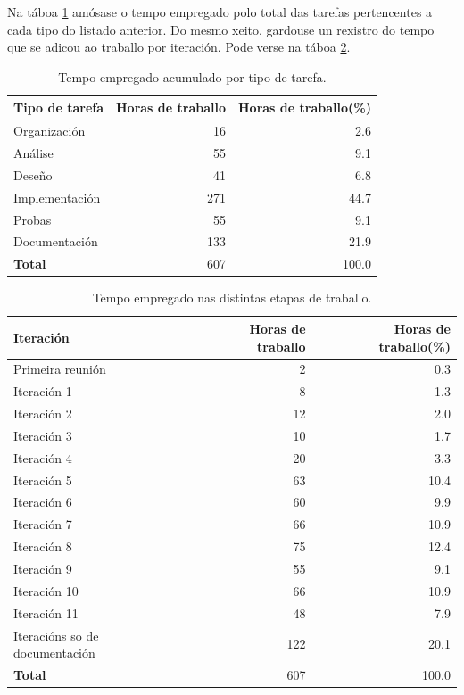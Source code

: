 Na táboa \ref{tab:tipo} amósase o tempo empregado polo total das tarefas pertencentes a cada tipo do listado anterior. Do mesmo xeito, gardouse un rexistro do tempo que se adicou ao traballo por iteración. Pode verse na táboa \ref{tab:custo}.

\begin{table}[H]
	\centering
	\begin{tabular}{|p{8cm}|r|r|}
		\hline
		\rowcolor{blue!10}
		Tipo de tarefa & Horas de traballo & Horas de traballo(\%) \\
		\hline
		Organización & 16 &  2.6\\
		\hline
		Análise & 55 &  9.1\\
		\hline
		Deseño & 41 &  6.8\\
		\hline
		Implementación & 271 &  44.7\\
		\hline
		Probas & 55 &  9.1\\
		\hline
		Documentación & 133 &  21.9\\
		\hline
		\textbf{Total} & 607 &  100.0\\
		\hline
	\end{tabular}
	\caption{Tempo empregado acumulado por tipo de tarefa.}
	\label{tab:tipo}
\end{table}


\begin{table}[H]
	\centering
	\begin{tabular}{|p{8cm}|r|r|}
		\hline
		\rowcolor{blue!10}
		Iteración & Horas de traballo & Horas de traballo(\%)\\
		\hline
		Primeira reunión & 2 &  0.3\\
		\hline
		Iteración 1 & 8 &  1.3\\
		\hline
		Iteración 2 & 12 &  2.0\\
		\hline
		Iteración 3 & 10 &  1.7\\
		\hline
		Iteración 4 & 20 &  3.3\\
		\hline
		Iteración 5 & 63 &  10.4\\
		\hline
		Iteración 6 & 60 &  9.9\\
		\hline
		Iteración 7 & 66 &  10.9\\
		\hline
		Iteración 8 & 75 &  12.4\\
		\hline
		Iteración 9 & 55 &  9.1\\
		\hline
		Iteración 10 & 66 &  10.9\\
		\hline
		Iteración 11 &  48 &  7.9\\
		\hline
		Iteracións so de documentación & 122 & 20.1\\
		\hline
		\textbf{Total} & 607 & 100.0 \\
		\hline
	\end{tabular}
	\caption{Tempo empregado nas distintas etapas de traballo.}
	\label{tab:custo}
\end{table}





